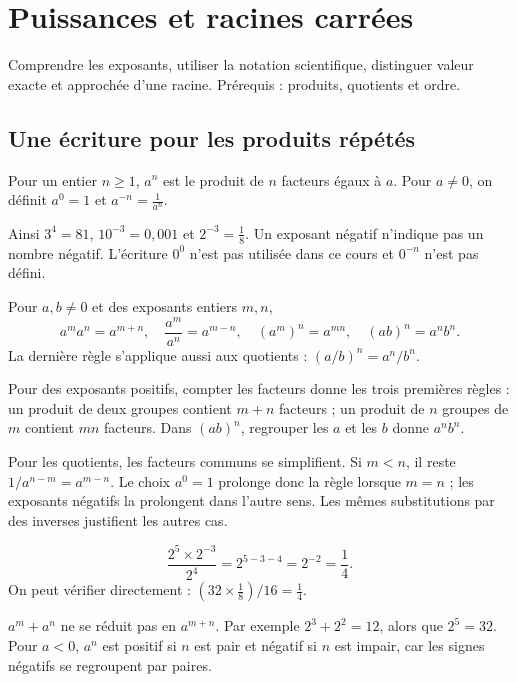 \documentclass[../cours_3e.tex]{subfiles}
\begin{document}
\setcounter{chapter}{3}
\chapter{Puissances et racines carrées}
\label{ch:puissances}
\begin{objectif}
Comprendre les exposants, utiliser la notation scientifique, distinguer valeur exacte et approchée d'une racine. Prérequis : produits, quotients et ordre.
\end{objectif}
\section{Une écriture pour les produits répétés}
\begin{definition}
Pour un entier $n\geq1$, $a^n$ est le produit de $n$ facteurs égaux à $a$. Pour $a\ne0$, on définit $a^0=1$ et $a^{-n}=\frac1{a^n}$.
\end{definition}
Ainsi $3^4=81$, $10^{-3}=0{,}001$ et $2^{-3}=\frac18$. Un exposant négatif n'indique pas un nombre négatif. L'écriture $0^0$ n'est pas utilisée dans ce cours et $0^{-n}$ n'est pas défini.
\begin{propriete}
Pour $a,b\ne0$ et des exposants entiers $m,n$,
\[
a^m a^n=a^{m+n},\quad
\frac{a^m}{a^n}=a^{m-n},\quad
(a^m)^n=a^{mn},\quad
(ab)^n=a^nb^n.
\]
La dernière règle s'applique aussi aux quotients : $(a/b)^n=a^n/b^n$.
\end{propriete}
\begin{demonstration}
Pour des exposants positifs, compter les facteurs donne les trois premières règles : un produit de deux groupes contient $m+n$ facteurs ; un produit de $n$ groupes de $m$ contient $mn$ facteurs. Dans $(ab)^n$, regrouper les $a$ et les $b$ donne $a^nb^n$.

Pour les quotients, les facteurs communs se simplifient. Si $m<n$, il reste $1/a^{n-m}=a^{m-n}$. Le choix $a^0=1$ prolonge donc la règle lorsque $m=n$ ; les exposants négatifs la prolongent dans l'autre sens. Les mêmes substitutions par des inverses justifient les autres cas.
\end{demonstration}
\begin{exemple}
\[\frac{2^5\times2^{-3}}{2^4}=2^{5-3-4}=2^{-2}=\frac14.\]
On peut vérifier directement : $(32\times\frac18)/16=\frac14$.
\end{exemple}
\begin{attention}
$a^m+a^n$ ne se réduit pas en $a^{m+n}$. Par exemple $2^3+2^2=12$, alors que $2^5=32$. Pour $a<0$, $a^n$ est positif si $n$ est pair et négatif si $n$ est impair, car les signes négatifs se regroupent par paires.
\end{attention}
\end{document}

